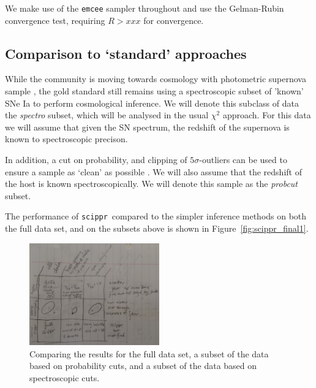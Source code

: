 \documentclass[12pt, twocolumn]{emulateapj}
\newcommand{\scippr}{\texttt{scippr}~}
\begin{document}
We make use of the {\tt emcee} \citep{emcee} sampler throughout and use the Gelman-Rubin convergence test, requiring $R > xxx$ for convergence.

\subsection{Comparison to `standard' approaches}
\label{sec:naive}
While the community is moving towards cosmology with photometric supernova sample \cite{Campbell_2013, hlozek_photometric_2012, Jones_2017}, the gold standard still remains using a spectroscopic subset of 'known' SNe Ia to perform cosmological inference. 
We will denote this subclass of data the \textit{spectro} subset, which will be analysed in the usual $\chi^2$ approach. 
For this data we will assume that given the SN spectrum, the redshift of the supernova is known to spectroscopic precison.

In addition, a cut on probability, and clipping of $5\sigma$-outliers can be used to ensure a sample as `clean' as possible \citep[eg. see][]{Campbell_2013}. 
We will also assume that the redshift of the host is known spectroscopically. 
We will denote this sample as the \textit{probcut} subset.

The performance of \scippr compared to the simpler inference methods on both the full data set, and on the subsets above is shown in Figure~\ref{fig:scippr_final1}.

\begin{figure}
	\begin{center}
	\includegraphics[width=0.5\textwidth]{fig/results1.png}

	\caption{Comparing the results for the full data set, a subset of the data based on probability cuts, and a subset of the data based on spectroscopic cuts.}
	\label{fig:results1}
	\end{center}
\end{figure}
\end{document}
